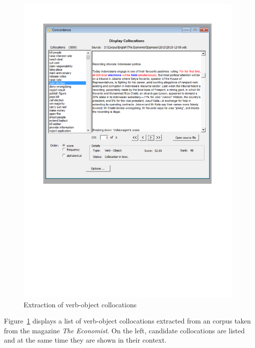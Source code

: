 \documentclass[output=paper]{langsci/langscibook}
\begin{document}
\begin{figure}[p]
      \includegraphics[scale=0.7, clip, trim=20mm 110mm 20mm 20mm]{figures/FipsCoPict.pdf}
\caption{\label{fou:figFips}Extraction of verb-object collocations}
\end{figure}


Figure~\ref{fou:figFips} displays a list of verb-object collocations extracted from an  corpus taken from the magazine \textit{The Economist}. On the left, candidate collocations are listed and at the same time they are shown in their context.
          
\end{document}
